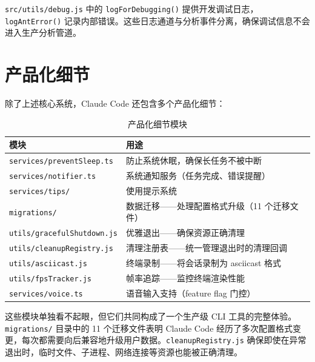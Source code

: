 \texttt{src/utils/debug.js} 中的 \texttt{logForDebugging()} 提供开发调试日志，\texttt{logAntError()} 记录内部错误。这些日志通道与分析事件分离，确保调试信息不会进入生产分析管道。

\section{产品化细节}

除了上述核心系统，Claude Code 还包含多个产品化细节：

\begin{table}[htbp]
\centering
\begin{tabularx}{\textwidth}{lX}
\toprule
\textbf{模块} & \textbf{用途} \\
\midrule
\texttt{services/preventSleep.ts} & 防止系统休眠，确保长任务不被中断 \\
\texttt{services/notifier.ts} & 系统通知服务（任务完成、错误提醒） \\
\texttt{services/tips/} & 使用提示系统 \\
\texttt{migrations/} & 数据迁移——处理配置格式升级（11 个迁移文件） \\
\texttt{utils/gracefulShutdown.js} & 优雅退出——确保资源正确清理 \\
\texttt{utils/cleanupRegistry.js} & 清理注册表——统一管理退出时的清理回调 \\
\texttt{utils/asciicast.js} & 终端录制——将会话录制为 asciicast 格式 \\
\texttt{utils/fpsTracker.js} & 帧率追踪——监控终端渲染性能 \\
\texttt{services/voice.ts} & 语音输入支持（feature flag 门控） \\
\bottomrule
\end{tabularx}
\caption{产品化细节模块}
\end{table}

这些模块单独看不起眼，但它们共同构成了一个生产级 CLI 工具的完整体验。\texttt{migrations/} 目录中的 11 个迁移文件表明 Claude Code 经历了多次配置格式变更，每次都需要向后兼容地升级用户数据。\texttt{cleanupRegistry.js} 确保即使在异常退出时，临时文件、子进程、网络连接等资源也能被正确清理。
